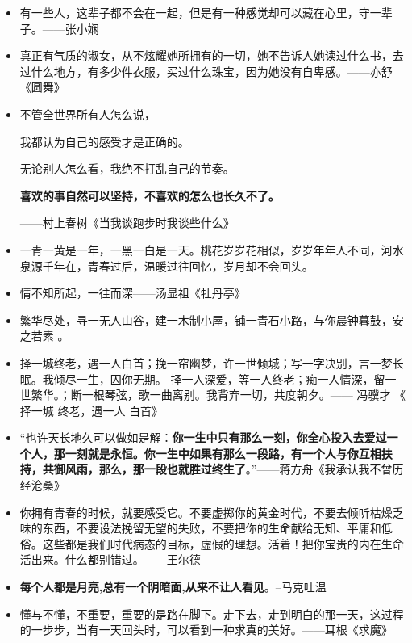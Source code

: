 \documentclass[UTF8,a4paper,8pt]{ctexbook}
\begin{document}
\begin{itemize}
		\item 有一些人，这辈子都不会在一起，但是有一种感觉却可以藏在心里，守一辈子。——张小娴
		
		\item 真正有气质的淑女，从不炫耀她所拥有的一切，她不告诉人她读过什么书，去过什么地方，有多少件衣服，买过什么珠宝，因为她没有自卑感。——亦舒《圆舞》
		
		\item 不管全世界所有人怎么说，
		
		我都认为自己的感受才是正确的。
		
		无论别人怎么看，我绝不打乱自己的节奏。
		
		\textbf{喜欢的事自然可以坚持，不喜欢的怎么也长久不了。}
		
		——村上春树《当我谈跑步时我谈些什么》
		
		\item 一青一黄是一年，一黑一白是一天。桃花岁岁花相似，岁岁年年人不同，河水泉源千年在，青春过后，温暖过往回忆，岁月却不会回头。
		
		\item 情不知所起，一往而深——汤显祖《牡丹亭》
		
		\item 繁华尽处，寻一无人山谷，建一木制小屋，铺一青石小路，与你晨钟暮鼓，安之若素 。
		
		\item 择一城终老，遇一人白首；挽一帘幽梦，许一世倾城；写一字决别，言一梦长眠。我倾尽一生，囚你无期。 择一人深爱，等一人终老；痴一人情深，留一世繁华。；断一根琴弦，歌一曲离别。我背弃一切，共度朝夕。—— 冯骥才 《 择一城 终老，遇一人 白首》
		
		\item “也许天长地久可以做如是解：\textbf{你一生中只有那么一刻，你全心投入去爱过一个人，那一刻就是永恒。你一生中如果有那么一段路，有一个人与你互相扶持，共御风雨，那么，那一段也就胜过终生了}。”——蒋方舟《我承认我不曾历经沧桑》
		
		\item 你拥有青春的时候，就要感受它。不要虚掷你的黄金时代，不要去倾听枯燥乏味的东西，不要设法挽留无望的失败，不要把你的生命献给无知、平庸和低俗。这些都是我们时代病态的目标，虚假的理想。活着！把你宝贵的内在生命活出来。什么都别错过。——王尔德
		
		\item \textbf{每个人都是月亮,总有一个阴暗面,从来不让人看见}。--马克吐温
		
		\item 懂与不懂，不重要，重要的是路在脚下。走下去，走到明白的那一天，这过程的一步步，当有一天回头时，可以看到一种求真的美好。——耳根《求魔》
		

\end{itemize}
\end{document}
